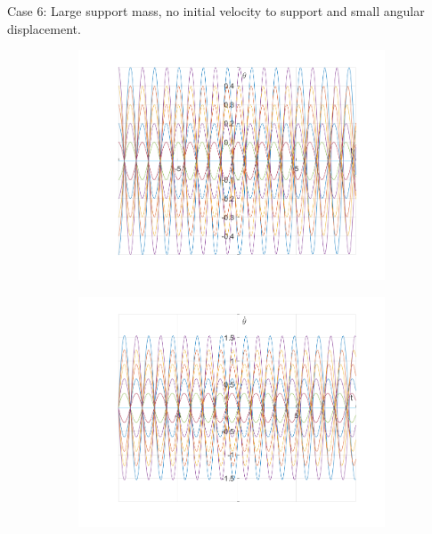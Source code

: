 \documentclass{article}
\begin{document}
	Case 6:
	Large support mass, no initial velocity to support and small angular displacement.
	\begin{figure}[h!]
		\centering
		\begin{subfigure}[b]{0.48\linewidth}
			\includegraphics[width=\linewidth]{./SmallOscillations/S6/F1.png}
		\end{subfigure}
		\begin{subfigure}[b]{0.48\linewidth}
			\includegraphics[width=\linewidth]{./SmallOscillations/S6/F2.png}
		\end{subfigure}
	\end{figure}
	
\end{document}
